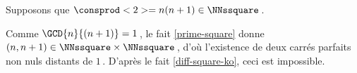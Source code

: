 Supposons que $\consprod<2> = n(n+1) \in \NNssquare$\,.

\smallskip

Comme $\GCD{n}{(n + 1)} = 1$\,, le fait \ref{prime-square} donne $(n, n + 1) \in \NNssquare \times \NNssquare$\,, d'où l'existence de deux carrés parfaits non nuls distants de $1$\,.
D'après le fait \ref{diff-square-ko}, ceci est impossible.